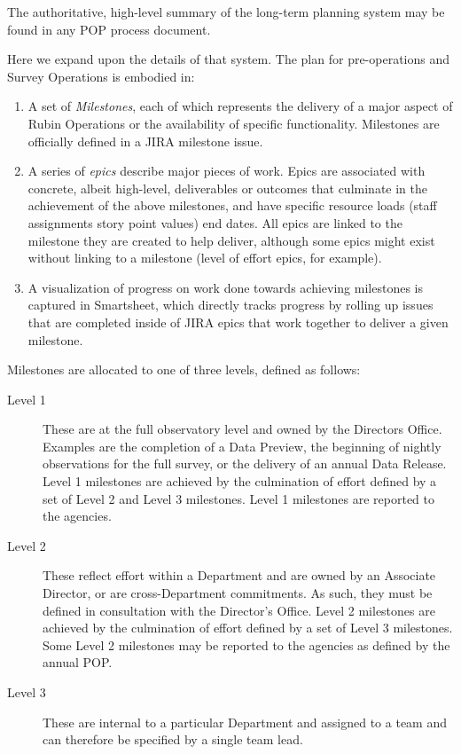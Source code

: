 The authoritative, high-level summary of the long-term planning system may be found in any POP process document.

Here we expand upon the details of that system.
The plan for pre-operations and Survey Operations is embodied in:

\begin{enumerate}
    \item
        A set of \emph{Milestones}, each of which represents the delivery of a major aspect of Rubin Operations or the availability of specific functionality. 
        Milestones are officially defined in a \gls{JIRA} milestone issue.
    \item
        A series of \emph{epics} describe major pieces of work. 
        Epics are associated with concrete, albeit high-level, deliverables or outcomes that culminate in the achievement of the above milestones, and have specific resource loads (staff assignments story point values) end dates. 
        All epics are linked to the milestone they are created to help deliver, although some epics might exist without linking to a milestone (level of effort epics, for example).  
    \item
        A visualization of progress on work done towards achieving milestones is captured in Smartsheet, which directly tracks progress by rolling up issues that are completed inside of \gls{JIRA} epics that work together to deliver a given milestone.      
\end{enumerate}

Milestones are allocated to one of three levels, defined as follows:

\begin{description}
\item[Level 1]
These are at the full observatory level and owned by the Directors Office. 
Examples are the completion of a Data Preview, the beginning of nightly observations for the full survey, or the delivery of an annual Data Release. 
Level 1 milestones are achieved by the culmination of effort defined by a set of Level 2 and Level 3 milestones. 
Level 1 milestones are reported to the agencies.
\item[Level 2]
These reflect effort within a Department and are owned by an Associate Director, or are cross-Department commitments. 
As such, they must be defined in consultation with the Director's Office.
Level 2 milestones are achieved by the culmination of effort defined by a set of Level 3 milestones.
Some Level 2 milestones may be reported to the agencies as defined by the annual POP. 
\item[Level 3]
These are internal to a particular Department and assigned to a team and can therefore be specified by a single team lead.
\end{description}

